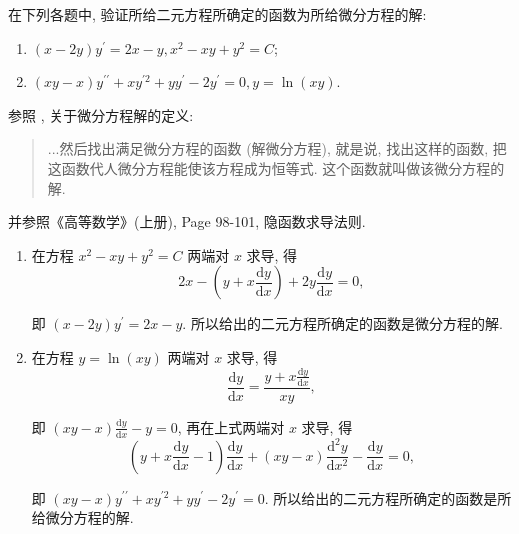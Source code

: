\documentclass[answer]{THUExam}
\begin{document}
\begin{problem}
在下列各题中, 验证所给二元方程所确定的函数为所给微分方程的解:
\begin{enumerate}
    \item $(x-2 y) y^{\prime}=2 x-y, x^2-x y+y^2=C$;
    \item $(x y-x) y^{\prime \prime}+x y^{\prime 2}+y y^{\prime}-2 y^{\prime}=0, y=\ln (x y)$.
\end{enumerate}
\end{problem}
\begin{note}
    参照 , 关于微分方程解的定义:
    \begin{quote}
        ...然后找出满足微分方程的函数 (解微分方程), 就是说, 找出这样的函数, 把这函数代人微分方程能使该方程成为恒等式. 这个函数就叫做该微分方程的解.
    \end{quote}
    并参照《高等数学》(上册), Page 98-101, 隐函数求导法则.
\end{note}
\begin{solution}
    \begin{enumerate}
        \item  在方程 $x^2-x y+y^2=C$ 两端对 $x$ 求导, 得
              $$
                  2 x-\left(y+x \frac{\mathrm{d}y}{\mathrm{d}x}\right)+2 y \frac{\mathrm{d}y}{\mathrm{d}x}=0,
              $$

              即 $(x-2 y) y^{\prime}=2 x-y$. 所以给出的二元方程所确定的函数是微分方程的解.
        \item 在方程 $y=\ln (x y)$ 两端对 $x$ 求导, 得
              $$
                  \frac{\mathrm{d}y}{\mathrm{d}x}=\frac{y+x \frac{\mathrm{d}y}{\mathrm{d}x}}{x y},
              $$

              即 $(x y-x) \frac{\mathrm{d}y}{\mathrm{d}x}-y=0$, 再在上式两端对 $x$ 求导, 得
              $$
                  \left(y+x \frac{\mathrm{d}y}{\mathrm{d}x}-1\right) \frac{\mathrm{d}y}{\mathrm{d}x}+(x y-x) \frac{\mathrm{d}^2y}{\mathrm{d}x^2}-\frac{\mathrm{d}y}{\mathrm{d}x}=0,
              $$

              即 $(x y-x) y^{\prime \prime}+x y^{\prime 2}+y y^{\prime}-2 y^{\prime}=0$. 所以给出的二元方程所确定的函数是所给微分方程的解.
    \end{enumerate}
\end{solution}
\end{document}
